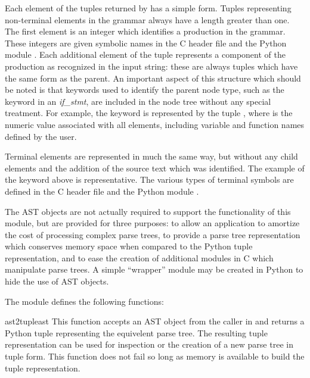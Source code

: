 Each element of the tuples returned by  has a simple
form.  Tuples representing non-terminal elements in the grammar always
have a length greater than one.  The first element is an integer which
identifies a production in the grammar.  These integers are given
symbolic names in the C header file  and the
Python module .  Each additional element of the
tuple represents a component of the production as recognized in the
input string: these are always tuples which have the same form as the
parent.  An important aspect of this structure which should be noted
is that keywords used to identify the parent node type, such as the
keyword  in an \emph{if\_stmt}, are included in the node tree
without any special treatment.  For example, the  keyword is
represented by the tuple , where  is the
numeric value associated with all  elements, including
variable and function names defined by the user.

Terminal elements are represented in much the same way, but without
any child elements and the addition of the source text which was
identified.  The example of the  keyword above is
representative.  The various types of terminal symbols are defined in
the C header file  and the Python module
.

The AST objects are not actually required to support the functionality
of this module, but are provided for three purposes: to allow an
application to amortize the cost of processing complex parse trees, to
provide a parse tree representation which conserves memory space when
compared to the Python tuple representation, and to ease the creation
of additional modules in C which manipulate parse trees.  A simple
``wrapper'' module may be created in Python to hide the use of AST
objects.


The  module defines the following functions:

\renewcommand{\indexsubitem}{(in module parser)}

\begin{funcdesc}{ast2tuple}{ast}
This function accepts an AST object from the caller in
 and returns a Python tuple representing the
equivelent parse tree.  The resulting tuple representation can be used
for inspection or the creation of a new parse tree in tuple form.
This function does not fail so long as memory is available to build
the tuple representation.
\end{funcdesc}


